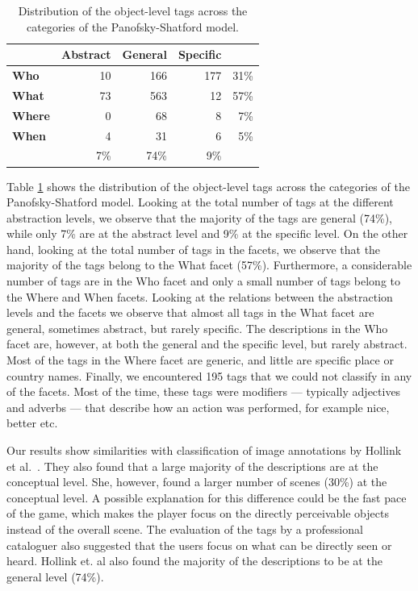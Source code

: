 \begin{table}
\begin{footnotesize}
\begin{tabular*}{\columnwidth}{@{\extracolsep{\fill}}lrrrr}
\toprule
\T \B & \textbf{Abstract} & \textbf{General} & \textbf{Specific}  \\
\midrule
\textbf{Who} \T \B & 10 & 166 &  177  & 31\%\\
\textbf{What} \B & 73 & 563 & 12 & 57\% \\
\textbf{Where} \B & 0 & 68 & 8& 7\%\\
\textbf{When} \B & 4 & 31 & 6 & 5\% \\
 \T & 7\% & 74\% & 9\% & \\
\bottomrule
\end{tabular*}
\end{footnotesize}
\label{object_tags}
\caption{Distribution of the object-level tags across the categories of the Panofsky-Shatford model.}
\end{table}


Table \ref{object_tags} shows the distribution of the object-level tags across
the categories of the Panofsky-Shatford model. Looking at the total number of
tags at the different abstraction levels, we observe that the majority of the
tags are general (74\%), while only 7\% are at the abstract level and 9\% at
the specific level. On the other hand, looking at the total number of tags in
the facets, we observe that the majority of the tags belong to the What facet
(57\%). Furthermore, a considerable number of tags are in the Who facet and
only a small number of tags belong to the Where and When facets. Looking at
the relations between the abstraction levels and the facets we observe that
almost all tags in the What facet are general, sometimes abstract, but rarely
specific. The descriptions in the Who facet are, however, at both the general
and the specific level, but rarely abstract. Most of the tags in the Where
facet are generic, and little are specific place or country names. Finally, we
encountered 195 tags that we could not classify in any of the facets. Most of
the time, these tags were modifiers --- typically adjectives and adverbs ---
that describe how an action was performed, for example nice, better etc.

Our results show similarities with classification of image annotations by
Hollink et al.~\cite{laurapaper}. They also found that a large majority of the
descriptions are at the conceptual level. She, however, found a larger number
of scenes (30\%) at the conceptual level. A possible explanation for this
difference could be the fast pace of the game, which makes the player focus on
the directly perceivable objects instead of the overall scene. The evaluation
of the tags by a professional cataloguer also suggested that the users focus
on what can be directly seen or heard. Hollink et. al also found the majority of the descriptions to be at the general level (74\%).


